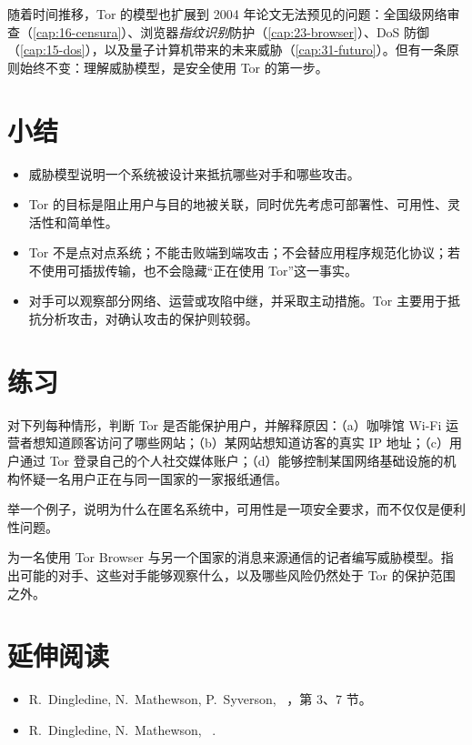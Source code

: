 随着时间推移，Tor 的模型也扩展到 2004 年论文无法预见的问题：全国级网络审查（\cref{cap:16-censura}）、浏览器\emph{指纹识别}防护（\cref{cap:23-browser}）、DoS 防御（\cref{cap:15-dos}），以及量子计算机带来的未来威胁（\cref{cap:31-futuro}）。但有一条原则始终不变：理解威胁模型，是安全使用 Tor 的第一步。

\section*{小结}
\begin{itemize}
  \item 威胁模型说明一个系统被设计来抵抗哪些对手和哪些攻击。
  \item Tor 的目标是阻止用户与目的地被关联，同时优先考虑可部署性、可用性、灵活性和简单性。
  \item Tor 不是点对点系统；不能击败端到端攻击；不会替应用程序规范化协议；若不使用可插拔传输，也不会隐藏“正在使用 Tor”这一事实。
  \item 对手可以观察部分网络、运营或攻陷中继，并采取主动措施。Tor 主要用于抵抗分析攻击，对确认攻击的保护则较弱。
\end{itemize}

\section*{练习}

\begin{esercizio}[1]\label{es:04-casi}
对下列每种情形，判断 Tor 是否能保护用户，并解释原因：（a）咖啡馆 Wi-Fi 运营者想知道顾客访问了哪些网站；（b）某网站想知道访客的真实 IP 地址；（c）用户通过 Tor 登录自己的个人社交媒体账户；（d）能够控制某国网络基础设施的机构怀疑一名用户正在与同一国家的一家报纸通信。
\end{esercizio}

\begin{esercizio}[2]\label{es:04-usabilita}
举一个例子，说明为什么在匿名系统中，可用性是一项安全要求，而不仅仅是便利性问题。
\end{esercizio}

\begin{esercizio}[2]\label{es:04-modello}
为一名使用 Tor Browser 与另一个国家的消息来源通信的记者编写威胁模型。指出可能的对手、这些对手能够观察什么，以及哪些风险仍然处于 Tor 的保护范围之外。
\end{esercizio}

\section*{延伸阅读}
\begin{itemize}
  \item R.~Dingledine, N.~Mathewson, P.~Syverson, ~\cite{dingledine2004tor}，第 3、7 节。
  \item R.~Dingledine, N.~Mathewson, ~\cite{dingledine2006company}.
\end{itemize}
